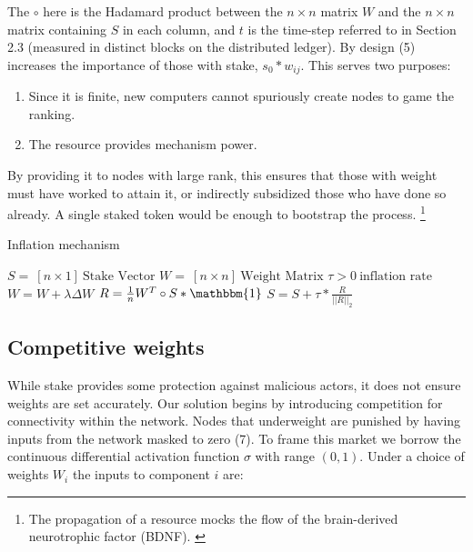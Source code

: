 \documentclass{article}
\begin{document}
The $\circ$ here is the Hadamard product between the $n \times n$ matrix $W$ and the $n \times n$ matrix containing $S$ in each column, and $t$ is the time-step referred to in Section 2.3 (measured in distinct blocks on the distributed ledger). By design (5) increases the importance of those with stake, $s_0 * w_{ij}$. This serves two purposes: 

\begin{enumerate}
	\item Since it is finite, new computers cannot spuriously create nodes to game the ranking.
	\item The resource provides mechanism power.
\end{enumerate}

By providing it to nodes with large rank, this ensures that those with weight must have worked to attain it, or indirectly subsidized those who have done so already. A single staked token would be enough to bootstrap the process. \footnote{The propagation of a resource mocks the flow of the brain-derived neurotrophic factor (BDNF). \cite{Bathina1989neurotrophin}} 
\smallskip

\begin{algorithm}
	\caption{Inflation mechanism}
	\begin{algorithmic} 
		
		\REQUIRE $S = \ [n \times 1] \ \textrm{Stake Vector}$
		\REQUIRE $W = \ [n \times n] \ \textrm{Weight Matrix}$
		\REQUIRE $\tau > 0 \ \textrm{inflation rate}$
		\STATE $W = W + \lambda \Delta W$
		\STATE $R = \frac{1}{n} W^T \circ S * \mathbbm{1}$
		\STATE $S = S + \tau * \frac{R}{||R||_2}  $
		\ENDWHILE
	\end{algorithmic}
\end{algorithm}
\smallskip

\subsection{Competitive weights}

While stake provides some protection against malicious actors, it does not ensure weights are set accurately. Our solution begins by introducing competition for connectivity within the network. Nodes that underweight are punished by having inputs from the network masked to zero (7). To frame this market we borrow the continuous differential activation function $\sigma$ with range $(0,1)$. Under a choice of weights $W_i$ the inputs to component $i$ are:
\bigskip
\end{document}
